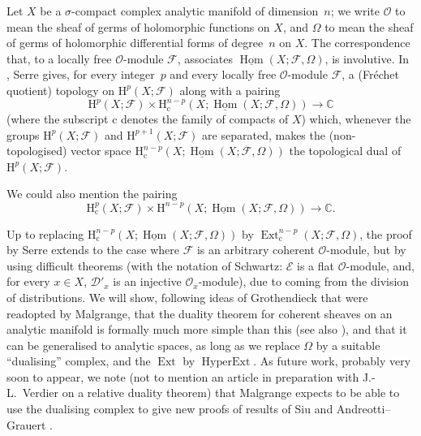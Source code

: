 \documentclass[british]{article}
\newcommand{\oldpage}[1]{\marginpar{\footnotesize$\Big\vert$ \textit{p.~#1}}}
\begin{document}
\oldpage{77}

Let \(X\) be a \(\sigma\)-compact complex analytic manifold of
dimension~\(n\); we write \({\mathscr{O}}\) to mean the sheaf of germs
of holomorphic functions on \(X\), and \(\Omega\) to mean the sheaf of
germs of holomorphic differential forms of degree~\(n\) on \(X\). The
correspondence that, to a locally free \({\mathscr{O}}\)-module
\({\mathscr{F}}\), associates
\(\underline{\operatorname{Hom}}(X;{\mathscr{F}},\Omega)\), is
involutive. In \autocite{11}, Serre gives, for every integer~\(p\) and
every locally free \({\mathscr{O}}\)-module \({\mathscr{F}}\), a
(Fréchet quotient) topology on \(\mathrm{H}^p(X;{\mathscr{F}})\) along
with a pairing \[
  \mathrm{H}^p(X;{\mathscr{F}}) \times \mathrm{H}_\mathrm{c}^{n-p}(X;\underline{\operatorname{Hom}}(X;{\mathscr{F}},\Omega))
  \to \mathbb{C}
\] (where the subscript \(\mathrm{c}\) denotes the family of compacts of
\(X\)) which, whenever the groups \(\mathrm{H}^p(X;{\mathscr{F}})\) and
\(\mathrm{H}^{p+1}(X;{\mathscr{F}})\) are separated, makes the
(non-topologised) vector space
\(\mathrm{H}_\mathrm{c}^{n-p}(X;\underline{\operatorname{Hom}}(X;{\mathscr{F}},\Omega))\)
the topological dual of \(\mathrm{H}^p(X;{\mathscr{F}})\).

We could also mention the pairing \[
  \mathrm{H}_\mathrm{c}^p(X;{\mathscr{F}}) \times \mathrm{H}^{n-p}(X;\underline{\operatorname{Hom}}(X;{\mathscr{F}},\Omega))
  \to\mathbb{C}.
\]

Up to replacing
\(\mathrm{H}_\mathrm{c}^{n-p}(X;\underline{\operatorname{Hom}}(X;{\mathscr{F}},\Omega))\)
by \(\operatorname{Ext}_\mathrm{c}^{n-p}(X;{\mathscr{F}},\Omega)\), the
proof by Serre extends \autocite{10} to the case where \({\mathscr{F}}\)
is an arbitrary coherent \({\mathscr{O}}\)-module, but by using
difficult theorems (with the notation of Schwartz: \({\mathscr{E}}\) is
a flat \({\mathscr{O}}\)-module, and, for every \(x\in X\),
\({\mathscr{D}}'_x\) is an injective \({\mathscr{O}}_x\)-module), due to
coming from the division of distributions. We will show, following ideas
of Grothendieck that were readopted by Malgrange, that the duality
theorem for coherent sheaves on an analytic manifold is formally much
more simple than this (see also \autocite{14}), and that it can be
generalised to analytic spaces, as long as we replace \(\Omega\) by a
suitable ``dualising'' complex, and the \(\operatorname{Ext}\) by
\(\operatorname{HyperExt}\). As future work, probably very soon to
appear, we note (not to mention an article in preparation with
J.-L.~Verdier on a relative duality theorem) that Malgrange expects to
be able to use the dualising complex to give new proofs of results of
Siu \autocite{13} and Andreotti--Grauert \autocite{1}.
\end{document}
